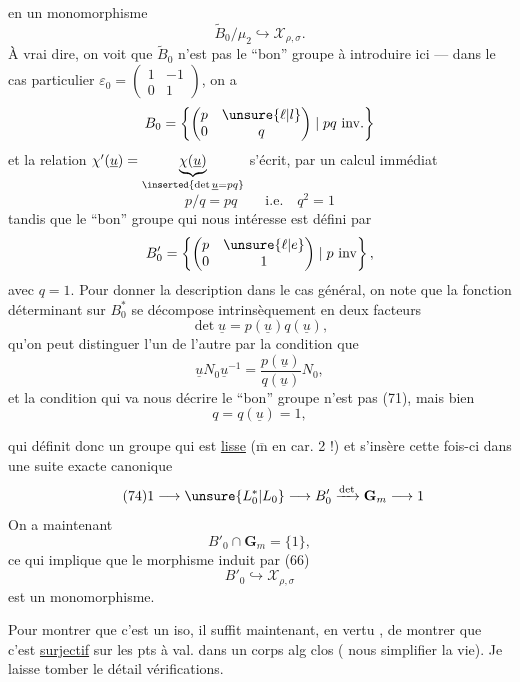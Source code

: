 en un monomorphisme
\[
\tag{70}
\widetilde B_0/\mu_2\hookrightarrow\mathcal X_{\rho,\sigma}.
\]
À vrai dire, on voit que $\widetilde B_0$ n'est pas le ``bon'' groupe à introduire ici --- dans le cas particulier $\varepsilon_0=\begin{pmatrix}1&-1\\0&1\end{pmatrix}$,  on a
\[
B_0=\left\{\begin{pmatrix}p&\unsure{\ell|l}\\0&q\end{pmatrix}\mid pq\ \mathrm{inv.}\right\}
\]
et la relation  $\chi'(\underline u)=\underbrace{\chi(\underline u)}_{\inserted{\det\underline u=pq}}$ s'écrit, par un calcul immédiat
\[
\tag{71}
p/q=pq\qquad\mathrm{i.e.}\quad q^2=1
\]
tandis que le ``bon'' groupe qui nous intéresse est défini par
\[
B'_0=\left\{\begin{pmatrix}p&\unsure{\ell|e}\\0&1\end{pmatrix}\mid p\ \mathrm{inv}\right\},
\]
 avec $q=1$. Pour donner la description dans le cas général, on note que la fonction déterminant sur $B_0^*$ se décompose intrinsèquement en deux facteurs
\[
\tag{72}
\det\underline u=p(\underline u)q(\underline u),
\]
qu'on peut distinguer l'un de l'autre  par la condition que
\[
\tag{73}
\underline uN_0\underline u^{-1}=\frac{p(\underline u)}{q(\underline u)}N_0,
\]
et la condition qui va nous décrire le ``bon'' groupe n'est pas (71), mais bien
\[
\tag{74}
q=q(\underline u)=1,
\]


qui définit donc un groupe qui est \uline{lisse} ($\overline{\mathrm m}$ en car. 2 !) et s'insère cette fois-ci dans une suite exacte canonique
\[
\tag{74}
1\longrightarrow\unsure{L_0^*|L_0}\longrightarrow B'_0\xrightarrow{\det}\mathbf G_m\longrightarrow1
\]
On a maintenant
\[
\tag{75}
B'_0\cap\mathbf G_m=\{1\},
\]
ce qui implique que le morphisme induit par (66)
\[
\tag{76}
B'_0\hookrightarrow\mathcal X_{\rho,\sigma}
\]
est un monomorphisme.

Pour montrer que c'est un iso, il suffit maintenant, en vertu , de montrer que c'est \uline{surjectif} sur les pts à val. dans un corps alg clos (  nous simplifier la vie). Je laisse tomber le détail  vérifications.



